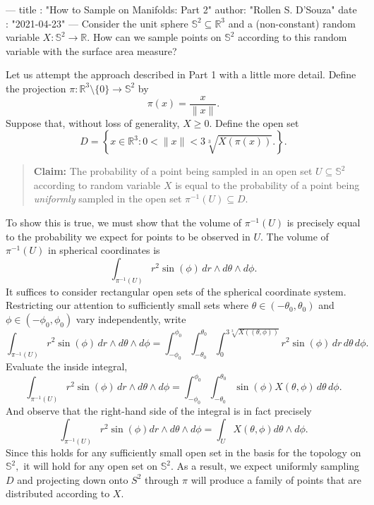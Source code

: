 ---
title :   "How to Sample on Manifolds: Part 2"
author:   "Rollen S. D'Souza"
date  :   "2021-04-23"
---
Consider the unit sphere \(\mathbb{S}^2 \subseteq \mathbb{R}^3\) and a (non-constant) random variable \(X: \mathbb{S}^2 \to \mathbb{R}.\)
How can we sample points on \(\mathbb{S}^2\) according to this random variable with the surface area measure?

Let us attempt the approach described in Part 1 with a little more detail.
Define the projection \(\pi: \mathbb{R}^3\setminus \{0\} \to \mathbb{S}^2\) by
\[
  \pi(x) = \frac{x}{\| x \|}.
\]
Suppose that, without loss of generality, \(X \geq 0.\) 
Define the open set
\[
  D = \left\{
    x \in \mathbb{R}^3
    \colon
    0 < \| x \| < 3\sqrt[3]{X(\pi(x))}.
  \right\}.
\]
\begin{quote}
  \textbf{Claim:}
  The probability of a point being sampled in an open set \(U \subseteq \mathbb{S}^2\) according to random variable \(X\) is equal to the probability of a point being \emph{uniformly} sampled in the open set \(\pi^{-1}(U) \subseteq D.\)
\end{quote}
To show this is true, we must show that the volume of \(\pi^{-1}(U)\) is precisely equal to the probability we expect for points to be observed in \(U.\)
The volume of \(\pi^{-1}(U)\) in spherical coordinates is
\[
  \int_{\pi^{-1}(U)}
    r^2 \sin(\phi)\, dr \wedge d\theta \wedge d\phi.
\]
It suffices to consider rectangular open sets of the spherical coordinate system.
Restricting our attention to sufficiently small sets where \(\theta \in (-\theta_0, \theta_0)\) and \(\phi \in (-\phi_0, \phi_0)\) vary independently, write
\[
  \int_{\pi^{-1}(U)}
    r^2 \sin(\phi) \, dr \wedge d\theta \wedge d\phi
  =
  \int_{-\phi_0}^{\phi_0}
  \int_{-\theta_0}^{\theta_0}
  \int_{0}^{3\sqrt[3]{X((\theta, \phi))}}
  r^2 \sin(\phi)\, dr\, d\theta\, d\phi.
\]
Evaluate the inside integral,
\[
  \int_{\pi^{-1}(U)}
    r^2 \sin(\phi)\, dr \wedge d\theta \wedge d\phi
  =
  \int_{-\phi_0}^{\phi_0}
  \int_{-\theta_0}^{\theta_0}
  \sin(\phi)
  X(\theta, \phi)\,
  d\theta\, d\phi.
\]
And observe that the right-hand side of the integral is in fact precisely
\[
  \int_{\pi^{-1}(U)}
  r^2 \sin(\phi) dr \wedge d\theta \wedge d\phi
  =
  \int_{U}
  X(\theta, \phi)
  d\theta \wedge d\phi.
\]
Since this holds for any sufficiently small open set in the basis for the topology on \(\mathbb{S}^2,\) it will hold for any open set on \(\mathbb{S}^2.\)
As a result, we expect uniformly sampling \(D\) and projecting down onto \(S^2\) through \(\pi\) will produce a family of points that are distributed according to \(X.\)
